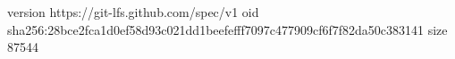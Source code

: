 version https://git-lfs.github.com/spec/v1
oid sha256:28bce2fca1d0ef58d93c021dd1beefefff7097c477909cf6f7f82da50c383141
size 87544
